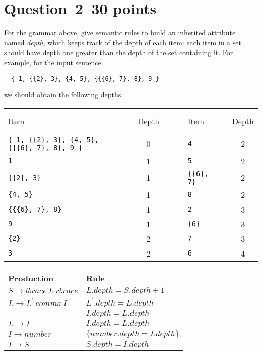 \documentclass[10pt]{article}
\begin{document}
\section*{Question~2~\hfill 30 points}
For the grammar above, give semantic rules to build
an inherited attribute named \emph{depth},
which keeps track of the depth of each item:
each item in a set should have depth one greater
than the depth of the set containing it.
For example, for the input sentence
\begin{verbatim}
  { 1, {{2}, 3}, {4, 5}, {{{6}, 7}, 8}, 9 }
\end{verbatim}
we should obtain the following depths.
\begin{center}
\begin{tabular}{lrcrlrc}
  Item & & Depth & ~ ~ ~ & Item & & Depth \\
  \cline{1-1} \cline{3-3} \cline{5-5} \cline{7-7}
  \verb|{ 1, {{2}, 3}, {4, 5}, {{{6}, 7}, 8}, 9 }| && 0
  && \verb|4| && 2 \\
  \verb|1|  && 1
  && \verb|5| && 2 \\
  \verb|{{2}, 3}| && 1
  && \verb|{{6}, 7}| && 2 \\
  \verb|{4, 5}| && 1
  && \verb|8| && 2 \\
  \verb|{{{6}, 7}, 8}| && 1
  && \verb|2| && 3 \\
  \verb|9| && 1
  && \verb|{6}| && 3 \\
  \verb|{2}| && 2
  && \verb|7| && 3 \\
  \verb|3| && 2
  && \verb|6| && 4
\end{tabular}
\end{center}

\begin{framed}
\centering
\begin{tabular}{l|l}
    Production                                                & Rule \\
    \hline
    $S  \rightarrow  \mathit{lbrace} ~L~ \mathit{rbrace}$     & $L.depth = S.depth + 1$ \\
    \hline
    $L  \rightarrow  L^\prime ~\mathit{comma}~ I$             & $L^\prime.depth = L.depth$ \\
                                                              & $I.depth = L.depth$ \\
    \hline
    $L  \rightarrow  I$                                       & $I.depth = L.depth$ \\
    \hline
    $I  \rightarrow  \mathit{number}$                         & $\{number.depth = I.depth\}$ \\
    \hline
    $I  \rightarrow  S$                                       & $S.depth = I.depth$ \\
\end{tabular}
\end{framed}
\end{document}
